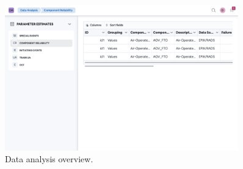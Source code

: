 \begin{figure}[h!]
  \centering
  \includegraphics[width=0.9\textwidth]{4_proposed_solution/web_app/figures/data_analysis.png}
  \caption{Data analysis overview.}
  \label{fig:data_analysis}
\end{figure}